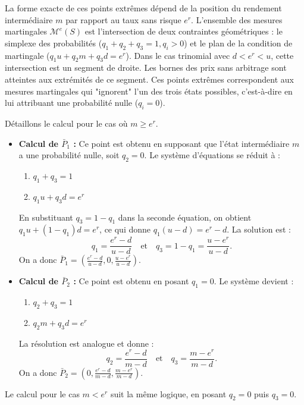 La forme exacte de ces points extrêmes dépend de la position du rendement intermédiaire $m$ par rapport au taux sans risque $e^r$.
L'ensemble des mesures martingales $\mathcal{M}^e(S)$ est l'intersection de deux contraintes géométriques : le simplexe des probabilités ($q_1+q_2+q_3=1, q_i>0$) et le plan de la condition de martingale ($q_1u + q_2m + q_3d = e^r$). Dans le cas trinomial avec $d < e^r < u$, cette intersection est un segment de droite. Les bornes des prix sans arbitrage sont atteintes aux extrémités de ce segment. Ces points extrêmes correspondent aux mesures martingales qui "ignorent" l'un des trois états possibles, c'est-à-dire en lui attribuant une probabilité nulle ($q_i=0$).

Détaillons le calcul pour le cas où $m \ge e^r$.

\begin{itemize}
    \item \textbf{Calcul de $\bar{P}_1$ :} Ce point est obtenu en supposant que l'état intermédiaire $m$ a une probabilité nulle, soit $q_2=0$. Le système d'équations se réduit à :
    \begin{enumerate}
        \item $q_1 + q_3 = 1$
        \item $q_1u + q_3d = e^r$
    \end{enumerate}
    En substituant $q_3 = 1 - q_1$ dans la seconde équation, on obtient $q_1u + (1 - q_1)d = e^r$, ce qui donne $q_1(u - d) = e^r - d$. La solution est :
    \[
    q_1 = \frac{e^r - d}{u - d} \quad \text{et} \quad q_3 = 1 - q_1 = \frac{u - e^r}{u - d}.
    \]
    On a donc $\bar{P}_1 = ( \frac{e^r-d}{u-d}, 0, \frac{u-e^r}{u-d} )$.

    \item \textbf{Calcul de $\bar{P}_2$ :} Ce point est obtenu en posant $q_1=0$. Le système devient :
    \begin{enumerate}
        \item $q_2 + q_3 = 1$
        \item $q_2m + q_3d = e^r$
    \end{enumerate}
    La résolution est analogue et donne :
    \[
    q_2 = \frac{e^r - d}{m - d} \quad \text{et} \quad q_3 = \frac{m - e^r}{m - d}.
    \]
    On a donc $\bar{P}_2 = ( 0, \frac{e^r-d}{m-d}, \frac{m-e^r}{m-d} )$.
\end{itemize}

Le calcul pour le cas $m < e^r$ suit la même logique, en posant $q_2=0$ puis $q_3=0$.


